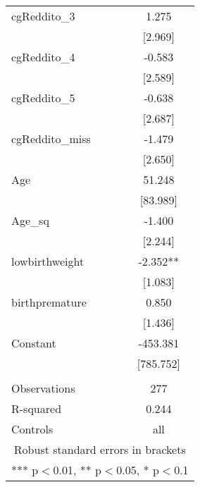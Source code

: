 \documentclass[]{article}
\begin{document}
\begin{tabular}{lc}
cgReddito\_3 & 1.275 \\
 & [2.969] \\
cgReddito\_4 & -0.583 \\
 & [2.589] \\
cgReddito\_5 & -0.638 \\
 & [2.687] \\
cgReddito\_miss & -1.479 \\
 & [2.650] \\
Age & 51.248 \\
 & [83.989] \\
Age\_sq & -1.400 \\
 & [2.244] \\
lowbirthweight & -2.352** \\
 & [1.083] \\
birthpremature & 0.850 \\
 & [1.436] \\
Constant & -453.381 \\
 & [785.752] \\
 &  \\
Observations & 277 \\
R-squared & 0.244 \\
 Controls & all \\ \hline
\multicolumn{2}{c}{ Robust standard errors in brackets} \\
\multicolumn{2}{c}{ *** p$<$0.01, ** p$<$0.05, * p$<$0.1} \\
\end{tabular}
\end{document}
